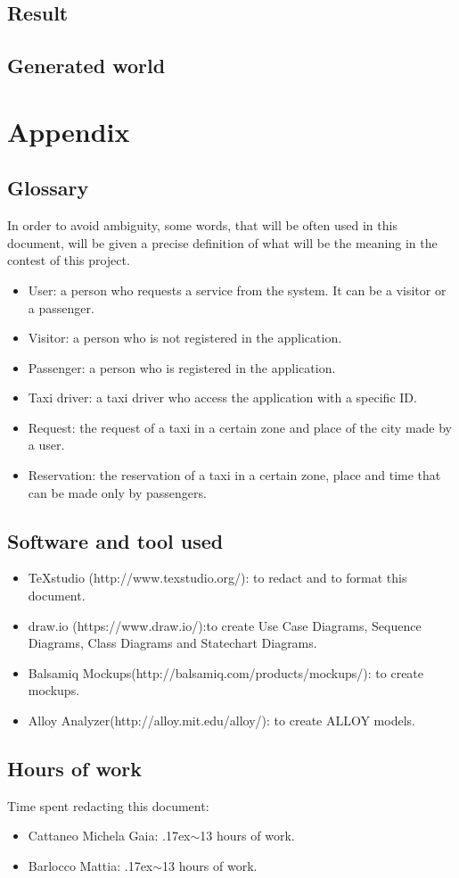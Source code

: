 \documentclass[18pt,oneside,a4paper, titlepage]{article}
\begin{document}
	\subsection{Result}
	\subsection{Generated world}

\newpage
\section{Appendix}
	\subsection{Glossary}
		In order to avoid ambiguity, some words, that will be often used in this document, will be given a precise definition of what will be the meaning in the contest of this project.
		\begin{itemize}
			\item User: a person who requests a service from the system. It can be a visitor or a passenger.
			\item Visitor: a person who is not registered in the application.
			\item Passenger: a person who is registered in the application.
			\item Taxi driver: a taxi driver who access the application with a specific ID.
			\item Request: the request of a taxi in a certain zone and place of the city made by a user.
			\item Reservation: the reservation of a taxi in a certain zone, place and time that can be made only by passengers.
	\end{itemize}
	\subsection{Software and tool used}
		\begin{itemize}
			\item TeXstudio (http://www.texstudio.org/): to redact and to format this document.
			\item draw.io (https://www.draw.io/):to create Use Case Diagrams, Sequence Diagrams, Class Diagrams and Statechart Diagrams.
			\item Balsamiq Mockups(http://balsamiq.com/products/mockups/): to create mockups.
			\item Alloy Analyzer(http://alloy.mit.edu/alloy/): to create ALLOY models.
		\end{itemize}
	
	\subsection{Hours of work}
		Time spent redacting this document:
		\begin{itemize}
			\item Cattaneo Michela Gaia: {\raise.17ex\hbox{$\scriptstyle\sim$}}13 hours of work.
			\item Barlocco Mattia: {\raise.17ex\hbox{$\scriptstyle\sim$}}13 hours of work.
		\end{itemize}
\end{document}
